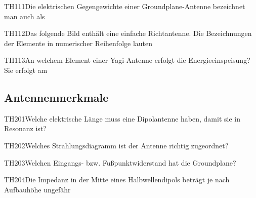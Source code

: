 \begin{question}{TH111}{Die elektrischen Gegengewichte einer Groundplane-Antenne bezeichnet man auch als}
\end{question}

\begin{question}{TH112}{Das folgende Bild enthält eine einfache Richtantenne. Die Bezeichnungen der Elemente in numerischer Reihenfolge lauten}
\end{question}

\begin{question}{TH113}{An welchem Element einer Yagi-Antenne erfolgt die Energieeinspeisung? Sie erfolgt am}
\end{question}

\subsection{Antennenmerkmale}

\begin{question}{TH201}{Welche elektrische Länge muss eine Dipolantenne haben, damit sie in Resonanz ist?}
\end{question}

\begin{question}{TH202}{Welches Strahlungsdiagramm ist der Antenne richtig zugeordnet?}
\end{question}

\begin{question}{TH203}{Welchen Eingangs- bzw. Fußpunktwiderstand hat die Groundplane?}
\end{question}

\begin{question}{TH204}{Die Impedanz in der Mitte eines Halbwellendipols beträgt je nach Aufbauhöhe ungefähr}
\end{question}

